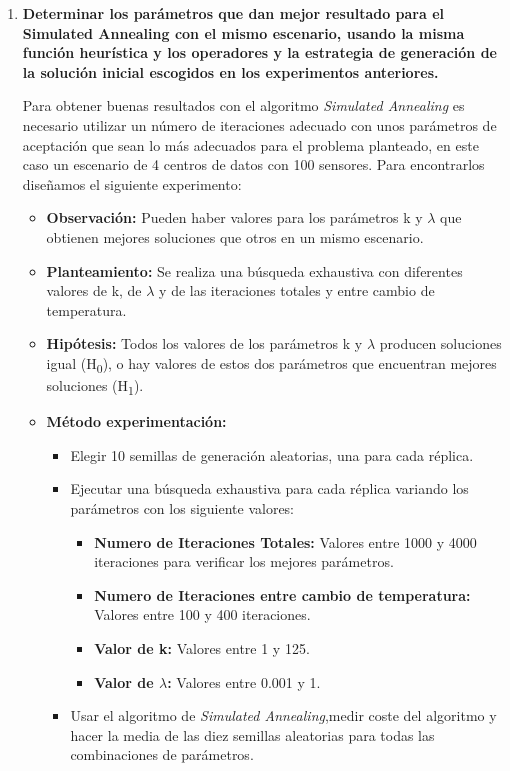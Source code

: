\documentclass{article}
\begin{document}
\begin{enumerate}
  \item \textbf{Determinar los parámetros que dan mejor resultado para el Simulated Annealing con el mismo escenario, usando la misma función heurística y los operadores y la estrategia de generación de la solución inicial escogidos en los experimentos anteriores.}

  Para obtener buenas resultados con el algoritmo \textit{Simulated Annealing} es necesario utilizar un número de iteraciones adecuado con unos parámetros de aceptación que sean lo más adecuados para el problema planteado, en este caso un escenario de 4 centros de datos con 100 sensores. Para encontrarlos diseñamos el siguiente experimento:

  \begin{itemize}
    \item \textbf{Observación:} Pueden haber valores para los parámetros k y ${\lambda}$ que obtienen mejores soluciones que otros en un mismo escenario.
    \item \textbf{Planteamiento:} Se realiza una búsqueda exhaustiva con diferentes valores de k, de ${\lambda}$ y de las iteraciones totales y entre cambio de temperatura.
    \item \textbf{Hipótesis:} Todos los valores de los parámetros k y ${\lambda}$  producen soluciones igual (H\textsubscript{0}), o hay valores de estos dos parámetros que encuentran mejores soluciones (H\textsubscript{1}).
    \item \textbf{Método experimentación:} \begin{itemize}
        \item Elegir 10 semillas de generación aleatorias, una para cada réplica.
        \item Ejecutar una búsqueda exhaustiva para cada réplica variando los parámetros con los siguiente valores:
        \begin{itemize}
            \item \textbf{Numero de Iteraciones Totales:} Valores entre 1000 y 4000 iteraciones para verificar los mejores parámetros.
            \item \textbf{Numero de Iteraciones entre cambio de temperatura:} Valores entre 100 y 400 iteraciones.
            \item \textbf{Valor de k:} Valores entre 1 y 125.
            \item \textbf{Valor de ${\lambda}$:} Valores entre 0.001 y 1.
        \end{itemize}
        \item Usar el algoritmo de \textit{Simulated Annealing},medir coste del algoritmo y hacer la media de las diez semillas aleatorias para todas las combinaciones de parámetros.
    \end{itemize}
  \end{itemize}


\end{enumerate}
\end{document}

